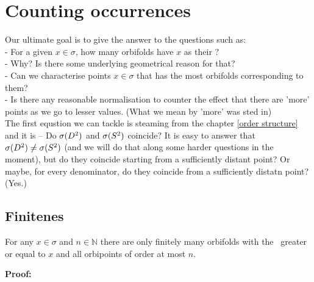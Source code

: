 \chapter{Counting occurrences} \label{counting occurrences}
Our ultimate goal is to give the answer to the questions such as: \\
- For a given $x \in \sigma$, how many orbifolds have $x$ as their \Eoc?\\
- Why? Is there some underlying geometrical reason for that?\\
- Can we characterise points $x \in \sigma$ that has the most orbifolds corresponding to them? \\
- Is there any reasonable normalisation to counter the effect that there are 'more' 
points as we go 
to lesser values. (What we mean by 'more' was sted in) \\
The first equstion we can tackle is steaming from the chapter \ref{order structure} 
and it is -- Do ${{\sigma}(D^2)}$ and ${{\sigma}(S^2)}$ coincide? It is easy to answer that ${{\sigma}(D^2)} \neq {{\sigma}(S^2)}$ 
(and we will do that along some harder questions in the moment), but do they coincide 
starting from a sufficiently distant point? Or maybe, for every denominator, do they coincide 
from a sufficiently distatn point? (Yes.) \\
\section{Finitenes}


\begin{observation}\label{first_finiteness_theorem}
For any $x \in \sigma$ and $n \in \mathbb{N}$ there are only finitely many orbifolds 
with the \Eoc\ greater or equal to $x$ and all orbipoints of order at most $n$.
\end{observation}
\textbf{Proof:}



